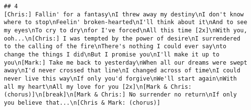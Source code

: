 \documentclass[]{article}
\begin{document}
\begin{verbatim}
## 4                                                                                                                                                                                                                                                                                                                                                                                                                                                                                                                                                                                                                                                                                                                                                                                                                                                                                                                                                                                                                                                                           [Chris:] Fallin' for a fantasy\nI threw away my destiny\nI don't know where to stop\nFeelin' broken-hearted\nI'll think about it\nAnd to see my eyes\nTo cry to dry\nfor I've forced\nAll this time [2x]\nWith you, ooh...\n[Chris:] I was tempted by the power of desire\nI surrendered to the calling of the fire\nThere's nothing I could ever say\nto change the things I did\nBut I promise you\nI'll make it up to you\n[Mark:] Take me back to yesterday\nWhen all our dreams were swept away\nI'd never crossed that line\nI changed across of time\nI could never live this way\nIf only you'd forgive\nWe'll start again\nWith all my heart\nAll my love for you [2x]\n[Mark & Chris: (chorus)]\n[break]\n[Mark & Chris:] No surrender no return\nIf only you believe that...\n[Chris & Mark: (chorus)]

\end{verbatim}
\end{document}
